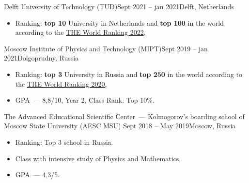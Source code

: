 
{Delft University of Technology (TUD)}{Sept 2021 -- jan 2021}{Delft, Netherlands}
\begin{itemize}
    \item Ranking: \textbf{top 10} University in Netherlands and \textbf{top 100} in the world according to the
    \href{https://www.timeshighereducation.com/world-university-rankings/2022/world-ranking}
    {\underline{THE World Ranking 2022}},
\end{itemize}
\divider

{Moscow Institute of Physics and Technology (MIPT)}{Sept 2019 -- jan 2021}{Dolgoprudny, Russia}
\begin{itemize}
    \item Ranking: \textbf{top 3} University in Russia and \textbf{top 250} in the world according to the
    \href{https://www.timeshighereducation.com/world-university-rankings/2020/world-ranking#!/page/0/length/25/sort_by/rank/sort_order/asc/cols/stats}
    {\underline{THE World Ranking 2020}},
    \item GPA~--- 8,8/10, Year 2, Class Rank: Top 10\%.
\end{itemize}
\divider


{The Advanced Educational Scientific Center~--- Kolmogorov’s boarding school of Moscow State University (AESC MSU)}
{Sept 2018 -- May 2019}{Moscow, Russia}
\begin{itemize}
    \item Ranking: Top 3 school in Russia.
\end{itemize}


\begin{itemize}
    \item Class with intensive study of Physics and Mathematics,
    \item GPA~--- 4,3/5.
\end{itemize}


